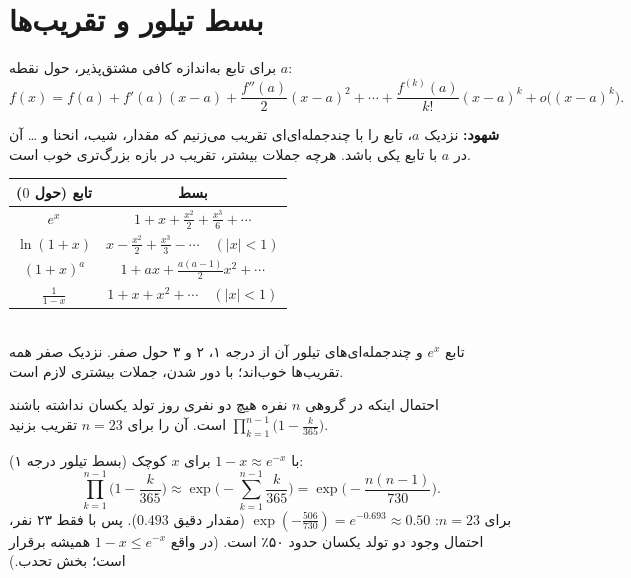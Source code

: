 \section{بسط تیلور و تقریب‌ها}
\begin{theorem}
برای تابع به‌اندازه کافی مشتق‌پذیر، حول نقطه $a$:
\[
f(x)=f(a)+f'(a)(x-a)+\frac{f''(a)}{2}(x-a)^2+\cdots+\frac{f^{(k)}(a)}{k!}(x-a)^k+o\big((x-a)^k\big).
\]
\end{theorem}
\textbf{شهود:} نزدیک $a$، تابع را با چندجمله‌ای‌ای تقریب می‌زنیم که مقدار، شیب، انحنا و \ldots{} آن در $a$ با تابع یکی باشد. هرچه جملات بیشتر، تقریب در بازه بزرگ‌تری خوب است.

\begin{center}
\renewcommand{\arraystretch}{1.6}
\begin{tabular}{c|c}
تابع (حول $0$) & بسط\\\hline
$e^x$ & $1+x+\frac{x^2}{2}+\frac{x^3}{6}+\cdots$\\
$\ln(1+x)$ & $x-\frac{x^2}{2}+\frac{x^3}{3}-\cdots\quad(|x|<1)$\\
$(1+x)^a$ & $1+ax+\frac{a(a-1)}{2}x^2+\cdots$\\
$\frac{1}{1-x}$ & $1+x+x^2+\cdots\quad(|x|<1)$
\end{tabular}
\end{center}

\begin{center}
\begin{tikzpicture}
\end{tikzpicture}\\
{\small تابع $e^x$ و چندجمله‌ای‌های تیلور آن از درجه ۱، ۲ و ۳ حول صفر. نزدیک صفر همه تقریب‌ها خوب‌اند؛ با دور شدن، جملات بیشتری لازم است.}
\end{center}

\begin{example}
احتمال اینکه در گروهی $n$ نفره هیچ دو نفری روز تولد یکسان نداشته باشند $\prod_{k=1}^{n-1}\big(1-\frac{k}{365}\big)$ است. آن را برای $n=23$ تقریب بزنید.
\begin{solution}
با $1-x\approx e^{-x}$ برای $x$ کوچک (بسط تیلور درجه ۱):
\[
\prod_{k=1}^{n-1}\Big(1-\frac{k}{365}\Big)\approx\exp\Big(-\sum_{k=1}^{n-1}\frac{k}{365}\Big)=\exp\Big(-\frac{n(n-1)}{730}\Big).
\]
برای $n=23$: $\exp(-\frac{506}{730})=e^{-0.693}\approx0.50$ (مقدار دقیق $0.493$). پس با فقط ۲۳ نفر، احتمال وجود دو تولد یکسان حدود ۵۰٪ است. (در واقع $1-x\le e^{-x}$ همیشه برقرار است؛ بخش تحدب.)
\end{solution}
\end{example}

